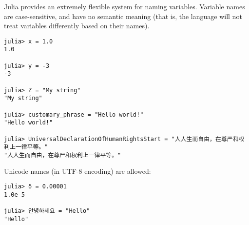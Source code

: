 \documentclass{book}
\begin{document}
Julia provides an extremely flexible system for naming variables. Variable names are case-sensitive, and have no semantic meaning (that is, the language will not treat variables differently based on their names).

\begin{verbatim}
julia> x = 1.0
1.0

julia> y = -3
-3

julia> Z = "My string"
"My string"

julia> customary_phrase = "Hello world!"
"Hello world!"

julia> UniversalDeclarationOfHumanRightsStart = "人人生而自由，在尊严和权利上一律平等。"
"人人生而自由，在尊严和权利上一律平等。"
\end{verbatim}

Unicode names (in UTF-8 encoding) are allowed:

\begin{verbatim}
julia> δ = 0.00001
1.0e-5

julia> 안녕하세요 = "Hello"
"Hello"
\end{verbatim}
\end{document}
